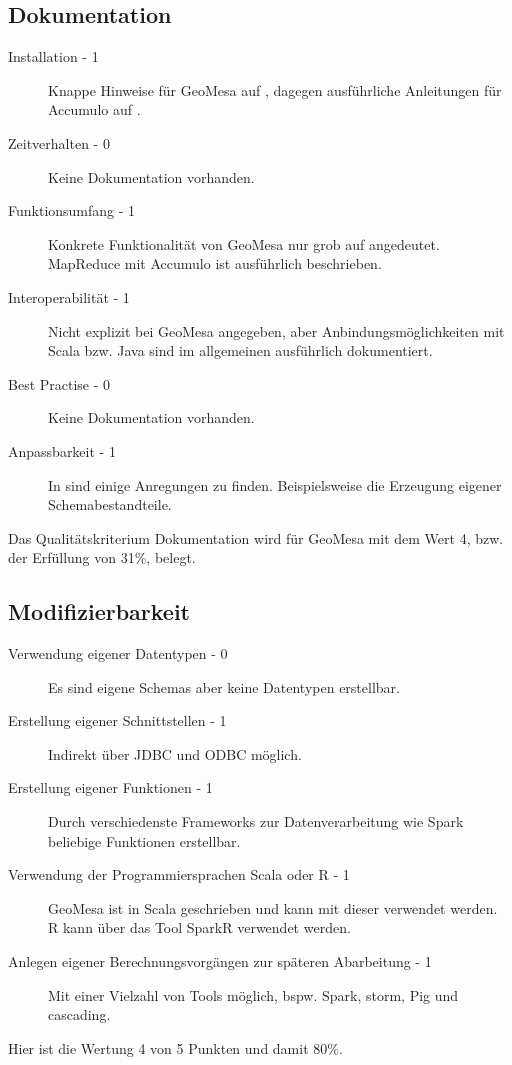 \subsection{Dokumentation}
\begin{description}
\item[Installation - 1] Knappe Hinweise für GeoMesa auf \cite{website:geomesa-quickstart}, dagegen ausführliche Anleitungen für Accumulo auf \cite{website:accumulo-manual}.
\item[Zeitverhalten - 0] Keine Dokumentation vorhanden. %
\item[Funktionsumfang - 1] Konkrete Funktionalität von GeoMesa nur grob auf \cite{website:geomesa-tutorials} angedeutet. MapReduce mit Accumulo ist ausführlich beschrieben. \cite{website:accumulo-manual}
\item[Interoperabilität - 1] Nicht explizit bei GeoMesa angegeben, aber Anbindungsmöglichkeiten mit Scala bzw. Java sind im allgemeinen ausführlich dokumentiert.
\item[Best Practise - 0] Keine Dokumentation vorhanden.
\item[Anpassbarkeit - 1] In \cite{website:geomesa-tutorials} sind einige Anregungen zu finden. Beispielsweise die Erzeugung eigener Schemabestandteile. \cite{website:geomesa-simplefeatures}
\end{description}
Das Qualitätskriterium Dokumentation wird für GeoMesa mit dem Wert 4, bzw. der Erfüllung von 31\%,  belegt.

\subsection{Modifizierbarkeit}
\begin{description}
\item[Verwendung eigener Datentypen - 0] Es sind eigene Schemas aber keine Datentypen erstellbar. \cite{website:geomesa-simplefeatures}
\item[Erstellung eigener Schnittstellen - 1] Indirekt über JDBC und ODBC möglich.
\item[Erstellung eigener Funktionen - 1] Durch verschiedenste Frameworks zur Datenverarbeitung wie Spark beliebige Funktionen erstellbar.
\item[Verwendung der Programmiersprachen Scala oder R - 1] GeoMesa ist in Scala geschrieben und kann mit dieser verwendet werden. R kann über das Tool SparkR verwendet werden.
\item[Anlegen eigener Berechnungsvorgängen zur späteren Abarbeitung - 1] Mit einer Vielzahl von Tools möglich, bspw. Spark, \Gls{storm}, Pig und \Gls{cascading}.
\end{description}
Hier ist die Wertung 4 von 5 Punkten und damit 80\%.

